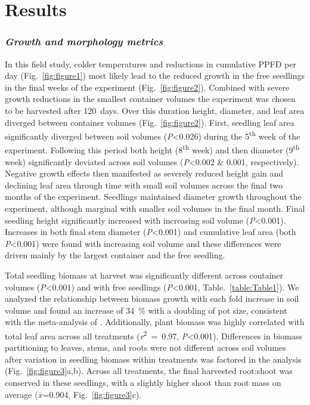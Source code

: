\documentclass[a4paper]{article}\usepackage[]{graphicx}\usepackage[]{color}
\begin{document}
\section*{Results}

\subsubsection*{\textit{Growth and morphology metrics}}

In this field study, colder temperatures and reductions in cumulative PPFD per day (Fig.~\ref{fig:figure1}) most likely lead to the reduced growth in the free seedlings in the final weeks of the experiment (Fig.~\ref{fig:figure2}).  Combined with severe growth reductions in the smallest container volumes the experiment was chosen to be harvested after 120~days. Over this duration height, diameter, and leaf area diverged between container volumes (Fig.~\ref{fig:figure2}).  First, seedling leaf area significantly diverged between soil volumes (\textit{P}\textless0.026) during the 5\textsuperscript{th} week of the experiment. Following this period both height (8\textsuperscript{th} week) and then diameter (9\textsuperscript{th} week) significantly deviated across soil volumes (\textit{P}\textless0.002 \& 0.001, respectively).  Negative growth effects then manifested as severely reduced height gain and declining leaf area through time with small soil volumes across the final two months of the experiment. Seedlings maintained diameter growth throughout the experiment, although marginal with smaller soil volumes in the final month. Final seedling height significantly increased with increasing soil volume (\textit{P}\textless0.001).  Increases in both final stem diameter (\textit{P}\textless0.001) and cumulative leaf area (both \textit{P}\textless0.001) were found with increasing soil volume and these differences were driven mainly by the largest container and the free seedling.

Total seedling biomass at harvest was significantly different across container volumes (\textit{P}\textless0.001) and with free seedlings (\textit{P}\textless0.001, Table.~\ref{table:Table1}). We analyzed the relationship between biomass growth with each fold increase in soil volume and found an increase of 34~\% with a doubling of pot size, consistent with the meta-analysis of \citet{poorter2012pot}. Additionally, plant biomass was highly correlated with total leaf area across all treatments (\textit{r}\textsuperscript{2}~=~0.97, \textit{P}\textless0.001). Differences in biomass partitioning to leaves, stems, and roots were not different across soil volumes after variation in seedling biomass within treatments was factored in the analysis (Fig.~\ref{fig:figure3}a,b). Across all treatments, the final harvested root:shoot was conserved in these seedlings, with a slightly higher shoot than root mass on average ($\overline{x}$=0.904, Fig.~\ref{fig:figure3}c).
\end{document}
